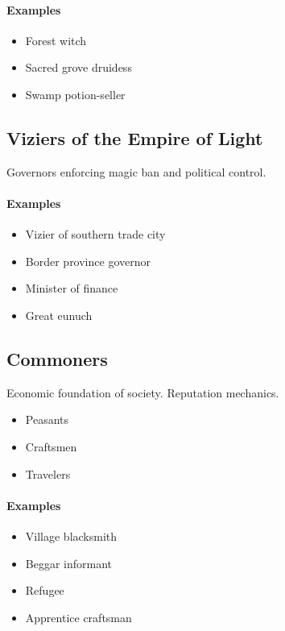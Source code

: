 \documentclass[a4paper,12pt]{article}
\begin{document}
\paragraph{Examples}
\begin{itemize}
\item Forest witch
\item Sacred grove druidess
\item Swamp potion-seller
\end{itemize}



\subsection{Viziers of the Empire of Light}

Governors enforcing magic ban and political control.

\paragraph{Examples}
\begin{itemize}
\item Vizier of southern trade city
\item Border province governor
\item Minister of finance
\item Great eunuch
\end{itemize}



\subsection{Commoners}

Economic foundation of society. Reputation mechanics.

\begin{itemize}
\item Peasants
\item Craftsmen
\item Travelers
\end{itemize}

\paragraph{Examples}
\begin{itemize}
\item Village blacksmith
\item Beggar informant
\item Refugee
\item Apprentice craftsman
\end{itemize}
\end{document}
